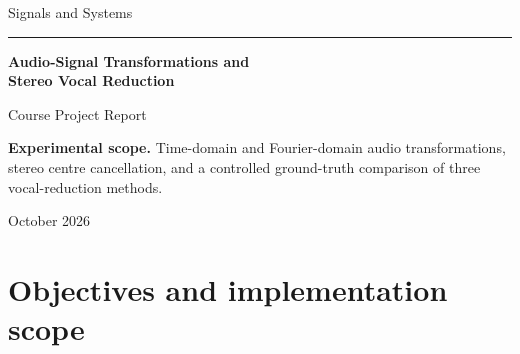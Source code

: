 \documentclass[11pt,a4paper]{article}
\begin{document}
\begin{titlepage}
  \centering
  \vspace*{2.0cm}
  {\Large Signals and Systems\par}
  \vspace{0.6cm}
  {\color{accent}\rule{0.82\textwidth}{1.2pt}\par}
  \vspace{0.9cm}
  {\Huge\bfseries Audio-Signal Transformations and\\[0.25em]
  Stereo Vocal Reduction\par}
  \vspace{0.7cm}
  {\Large Course Project Report\par}
  \vfill
  \begin{minipage}{0.82\textwidth}
    \colorbox{soft}{\parbox{0.94\textwidth}{
      \textbf{Experimental scope.} Time-domain and Fourier-domain audio
      transformations, stereo centre cancellation, and a controlled
      ground-truth comparison of three vocal-reduction methods.
    }}
  \end{minipage}
  \vfill
  {\large October 2026\par}
\end{titlepage}

\begin{abstract}
This project applies core signals-and-systems concepts to digital audio. The
first part demonstrates time reversal and scaling, the discrete Fourier
transform (DFT), magnitude-only and phase-only reconstruction, and ideal
low-pass filtering. The second part studies stereo centre cancellation as a
simple vocal-reduction technique. In addition to the original $L-R$ baseline
and a low-frequency ``bass rescue'' variant, this edition introduces a
gain-and-delay compensated method for imperfectly centred vocals. A synthetic
benchmark with known vocal and accompaniment components shows the central
trade-off: under a two-sample, $0.82\times$ channel mismatch, compensation
improves vocal attenuation from $-10.69$ dB to $-26.54$ dB, while accompaniment
quality falls to $12.06$ dB SDR. The result is therefore an improvement for a
specific failure mode, not a universal vocal separator.
\end{abstract}

\tableofcontents
\newpage

\section{Objectives and implementation scope}
\end{document}
